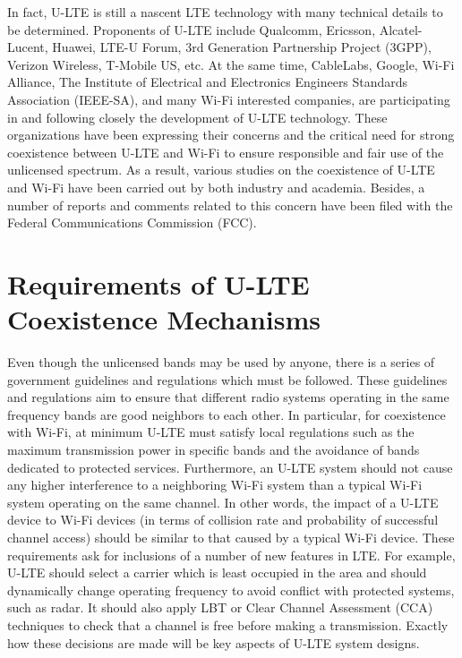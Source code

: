 In fact, \mbox{U-LTE} is still a nascent LTE technology with many technical details to be determined. Proponents of \mbox{U-LTE} include Qualcomm, Ericsson, Alcatel-Lucent, Huawei, \mbox{LTE-U} Forum, 3rd Generation Partnership Project (3GPP), Verizon Wireless, T-Mobile US, etc. At the same time, CableLabs, Google, \mbox{Wi-Fi} Alliance, The Institute of Electrical and Electronics Engineers Standards Association (IEEE-SA), and many \mbox{Wi-Fi} interested companies, are participating in and following closely the development of \mbox{U-LTE} technology. These organizations have been expressing their concerns and the critical need for strong coexistence between \mbox{U-LTE} and \mbox{Wi-Fi} to ensure responsible and fair use of the unlicensed spectrum. As a result, various studies on the coexistence of \mbox{U-LTE} and \mbox{Wi-Fi} have been carried out by both industry and academia. Besides, a number of reports and comments related to this concern have been filed with the Federal Communications Commission (FCC).


\section{Requirements of U-LTE Coexistence Mechanisms}
\label{reqs}
Even though the unlicensed bands may be used by anyone, there is a series of government guidelines and regulations which must be followed. These guidelines and regulations aim to ensure that different radio systems operating in the same frequency bands are good neighbors to each other. In particular, for coexistence with \mbox{Wi-Fi}, at minimum \mbox{U-LTE} must satisfy local regulations such as the maximum transmission power in specific bands and the avoidance of bands dedicated to protected services. Furthermore, an \mbox{U-LTE} system should not cause any higher interference to a neighboring \mbox{Wi-Fi} system than a typical \mbox{Wi-Fi} system operating on the same channel. In other words, the impact of a \mbox{U-LTE} device to \mbox{Wi-Fi} devices (in terms of collision rate and probability of successful channel access) should be similar to that caused by a typical \mbox{Wi-Fi} device. These requirements ask for inclusions of a number of new features in LTE. For example, \mbox{U-LTE} should select a carrier which is least occupied in the area and should dynamically change operating frequency to avoid conflict with protected systems, such as radar. It should also apply LBT or Clear Channel Assessment (CCA) techniques to check that a channel is free before making a transmission. Exactly how these decisions are made will be key aspects of \mbox{U-LTE} system designs.


